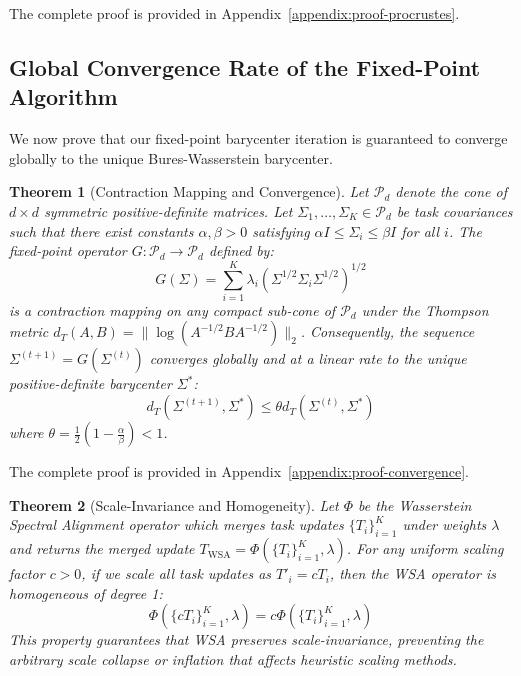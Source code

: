 \documentclass{article}
\theoremstyle{plain}
\newtheorem{theorem}{Theorem}[section]
\theoremstyle{definition}
\theoremstyle{remark}
\begin{document}
The complete proof is provided in Appendix~\ref{appendix:proof-procrustes}.

\subsection{Global Convergence Rate of the Fixed-Point Algorithm}
We now prove that our fixed-point barycenter iteration is guaranteed to converge globally to the unique Bures-Wasserstein barycenter.

\begin{theorem}[Contraction Mapping and Convergence]
Let $\mathcal{P}_d$ denote the cone of $d \times d$ symmetric positive-definite matrices. Let $\Sigma_1, \dots, \Sigma_K \in \mathcal{P}_d$ be task covariances such that there exist constants $\alpha, \beta > 0$ satisfying $\alpha I \le \Sigma_i \le \beta I$ for all $i$.
The fixed-point operator $G: \mathcal{P}_d \to \mathcal{P}_d$ defined by:
\begin{equation}
  G(\Sigma) = \sum_{i=1}^K \lambda_i \left( \Sigma^{1/2} \Sigma_i \Sigma^{1/2} \right)^{1/2}
\end{equation}
is a contraction mapping on any compact sub-cone of $\mathcal{P}_d$ under the Thompson metric $d_T(A, B) = \| \log(A^{-1/2} B A^{-1/2}) \|_2$. Consequently, the sequence $\Sigma^{(t+1)} = G(\Sigma^{(t)})$ converges globally and at a linear rate to the unique positive-definite barycenter $\Sigma^*$:
\begin{equation}
  d_T(\Sigma^{(t+1)}, \Sigma^*) \leq \theta d_T(\Sigma^{(t)}, \Sigma^*)
\end{equation}
where $\theta = \frac{1}{2} \left( 1 - \frac{\alpha}{\beta} \right) < 1$.
\end{theorem}

The complete proof is provided in Appendix~\ref{appendix:proof-convergence}.

\begin{theorem}[Scale-Invariance and Homogeneity]
Let $\Phi$ be the Wasserstein Spectral Alignment operator which merges task updates $\{T_i\}_{i=1}^K$ under weights $\lambda$ and returns the merged update $T_{\text{WSA}} = \Phi(\{T_i\}_{i=1}^K, \lambda)$. For any uniform scaling factor $c > 0$, if we scale all task updates as $T'_i = c T_i$, then the WSA operator is homogeneous of degree 1:
\begin{equation}
  \Phi(\{c T_i\}_{i=1}^K, \lambda) = c \Phi(\{T_i\}_{i=1}^K, \lambda)
\end{equation}
This property guarantees that WSA preserves scale-invariance, preventing the arbitrary scale collapse or inflation that affects heuristic scaling methods.
\end{theorem}
\end{document}
